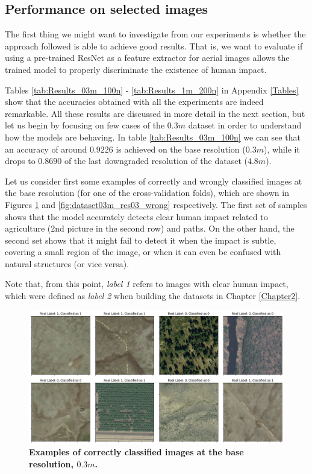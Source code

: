 \subsection{Performance on selected images}
The first thing we might want to investigate from our experiments is whether the approach followed is able to achieve good results. That is, we want to evaluate if using a pre-trained ResNet as a feature extractor for aerial images allows the trained model to properly discriminate the existence of human impact. 

Tables \ref{tab:Results_03m_100n} - \ref{tab:Results_1m_200n} in Appendix \ref{Tables} show that the accuracies obtained with all the experiments are indeed remarkable. All these results are discussed in more detail in the next section, but let us begin by focusing on few cases of the $0.3m$ dataset in order to understand how the models are behaving. In table \ref{tab:Results_03m_100n} we can see that an accuracy of around $0.9226$ is achieved on the base resolution ($0.3m$), while it drops to $0.8690$ of the last downgraded resolution of the dataset ($4.8m$).

Let us consider first some examples of correctly and wrongly classified images at the base resolution (for one of the cross-validation folds), which are shown in Figures \ref{fig:dataset03m_res03_correct} and \ref{fig:dataset03m_res03_wrong} respectively. The first set of samples shows that the model accurately detects clear human impact related to agriculture (2nd picture in the second row) and paths. On the other hand, the second set shows that it might fail to detect it when the impact is subtle, covering a small region of the image, or when it can even be confused with natural structures (or vice versa).

Note that, from this point, \textit{label 1} refers to images with clear human impact, which were defined as \textit{label 2} when building the datasets in Chapter \ref{Chapter2}.

\begin{figure}[H]
	\centering
	\captionsetup{width=1\linewidth}
	\includegraphics[width=1\textwidth]{Figures/results/class_dataset03m_res03_correct.png}
	\caption{\textbf{Examples of correctly classified images at the base resolution, $0.3m$.}}
	\label{fig:dataset03m_res03_correct}
\end{figure}

